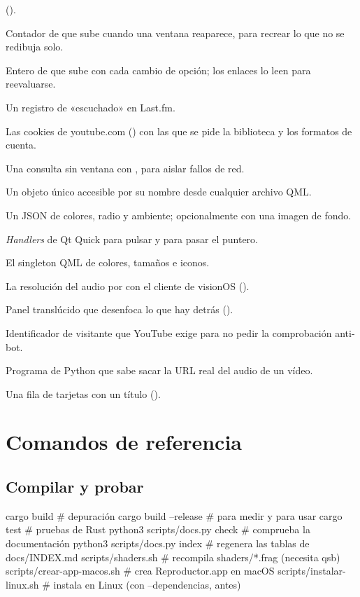 \begin{description}[style=nextline, leftmargin=0pt, itemsep=0.5em]
  ().
  \item[\cod{renderEpoch}] Contador de  que sube cuando una ventana reaparece, para
  recrear lo que no se redibuja solo.
  \item[\cod{revision}] Entero de  que sube con cada cambio de opción; los
  enlaces lo leen para reevaluarse.
  \item[\emph{Scrobble}] Un registro de «escuchado» en Last.fm.
  \item[Sesión] Las cookies de youtube.com () con las que se pide la
  biblioteca y los formatos de cuenta.
  \item[Sonda (\emph{probe})] Una consulta sin ventana con , para aislar fallos de
  red.
  \item[Singleton] Un objeto único accesible por su nombre desde cualquier archivo QML.
  \item[Skin] Un JSON de colores, radio y ambiente; opcionalmente con una imagen de fondo.
  \item[\cod{TapHandler}, \cod{HoverHandler}] \emph{Handlers} de Qt Quick para pulsar y para
  pasar el puntero.
  \item[\cod{Theme}] El singleton QML de colores, tamaños e iconos.
  \item[Vía rápida] La resolución del audio por  con el cliente de visionOS
  ().
  \item[Vidrio] Panel translúcido que desenfoca lo que hay detrás ().
  \item[Visitor data] Identificador de visitante que YouTube exige para no pedir la
  comprobación anti-bot.
  \item[yt-dlp] Programa de Python que sabe sacar la URL real del audio de un vídeo.
  \item[Zona] Una fila de tarjetas con un título ().
\end{description}

\section{Comandos de referencia}

\subsection{Compilar y probar}

\begin{terminal}
cargo build                     # depuración
cargo build --release           # para medir y para usar
cargo test                      # pruebas de Rust
python3 scripts/docs.py check   # comprueba la documentación
python3 scripts/docs.py index   # regenera las tablas de docs/INDEX.md
scripts/shaders.sh              # recompila shaders/*.frag (necesita qsb)
scripts/crear-app-macos.sh      # crea Reproductor.app en macOS
scripts/instalar-linux.sh       # instala en Linux (con --dependencias, antes)
\end{terminal}

